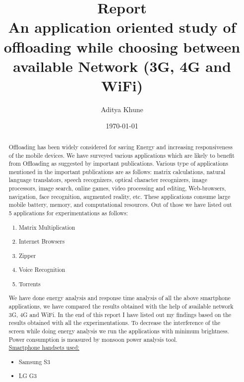 \documentclass{report}
\begin{document}
\title{Report\\
An application oriented study of offloading while
choosing between available Network (3G, 4G and WiFi)}

\author{Aditya Khune}

\date{\today}  %
\maketitle
\tableofcontents

\begin{abstract}
Offloading has been widely considered for saving Energy and increasing responsiveness of the mobile
devices.
We have surveyed various applications which are likely to benefit from Offloading as suggested by
important publications. Various type of applications mentioned in the important publications are as follows:
matrix calculations, natural language translators, speech recognizers, optical character recognizers, image processors, image
search, online games, video processing and editing, Web-browsers, navigation, face recognition, augmented reality, etc.
These applications consume large mobile battery, memory, and computational resources.
Out of those we have listed out 5 applications for experimentations as follows:
\begin{enumerate}
\item Matrix Multiplication
\item Internet Browsers
\item Zipper
\item Voice Recognition
\item Torrents
\end{enumerate}
We have done energy analysis and response time analysis of all the above smartphone applications, we have compared the results obtained with the help of available network 3G, 4G and WiFi. In the end of this report I have listed out my findings based on the results obtained with all the experimentations.
To decrease the interference of the screen while doing energy analysis we run the applications with minimum brightness. Power consumption is measured by monsoon power analysis tool. \\

\underline{Smartphone handsets used:}
\begin{itemize}
\item Samsung S3
\item LG G3


\end{itemize}
\end{abstract}
\end{document}

